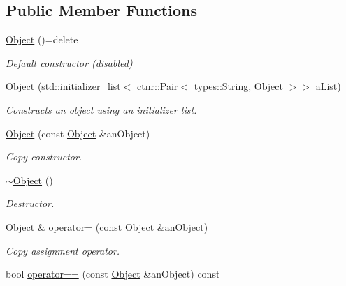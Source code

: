 \subsection*{Public Member Functions}
\begin{DoxyCompactItemize}
\item 
\hyperlink{classostk_1_1core_1_1ctnr_1_1_object_a8e5ab6d15d9e28f3e2c65572f22aeb74}{Object} ()=delete
\begin{DoxyCompactList}\small\item\em Default constructor (disabled) \end{DoxyCompactList}\item 
\hyperlink{classostk_1_1core_1_1ctnr_1_1_object_aaf1dbebfc8a63661fb2789f8dd286054}{Object} (std\+::initializer\+\_\+list$<$ \hyperlink{namespaceostk_1_1core_1_1ctnr_a08e64f04352e3c432bff0cfd3b23923b}{ctnr\+::\+Pair}$<$ \hyperlink{classostk_1_1core_1_1types_1_1_string}{types\+::\+String}, \hyperlink{classostk_1_1core_1_1ctnr_1_1_object}{Object} $>$$>$ a\+List)
\begin{DoxyCompactList}\small\item\em Constructs an object using an initializer list. \end{DoxyCompactList}\item 
\hyperlink{classostk_1_1core_1_1ctnr_1_1_object_a1d2f5d239649fce130631e7b592d5ec2}{Object} (const \hyperlink{classostk_1_1core_1_1ctnr_1_1_object}{Object} \&an\+Object)
\begin{DoxyCompactList}\small\item\em Copy constructor. \end{DoxyCompactList}\item 
\hyperlink{classostk_1_1core_1_1ctnr_1_1_object_aef383174a379dcd563b2071a7db9b9f5}{$\sim$\+Object} ()
\begin{DoxyCompactList}\small\item\em Destructor. \end{DoxyCompactList}\item 
\hyperlink{classostk_1_1core_1_1ctnr_1_1_object}{Object} \& \hyperlink{classostk_1_1core_1_1ctnr_1_1_object_a575cbad747a3c84172172309bd8b50b2}{operator=} (const \hyperlink{classostk_1_1core_1_1ctnr_1_1_object}{Object} \&an\+Object)
\begin{DoxyCompactList}\small\item\em Copy assignment operator. \end{DoxyCompactList}\item 
bool \hyperlink{classostk_1_1core_1_1ctnr_1_1_object_a1c940e65a47c52815da5b2e86eaa5264}{operator==} (const \hyperlink{classostk_1_1core_1_1ctnr_1_1_object}{Object} \&an\+Object) const
$$
\end{DoxyCompactItemize}
